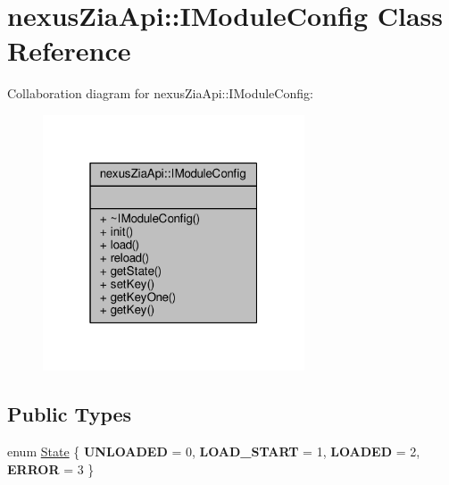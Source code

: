 \hypertarget{classnexusZiaApi_1_1IModuleConfig}{}\section{nexus\+Zia\+Api\+:\+:I\+Module\+Config Class Reference}
\label{classnexusZiaApi_1_1IModuleConfig}


Collaboration diagram for nexus\+Zia\+Api\+:\+:I\+Module\+Config\+:\nopagebreak
\begin{figure}[H]
\begin{center}
\leavevmode
\includegraphics[width=220pt]{classnexusZiaApi_1_1IModuleConfig__coll__graph}
\end{center}
\end{figure}
\subsection*{Public Types}
\begin{DoxyCompactItemize}
\item 
enum \hyperlink{classnexusZiaApi_1_1IModuleConfig_af31b1666dea53f8776c7399e6df9e865}{State} \{ {\bfseries U\+N\+L\+O\+A\+D\+ED} = 0, 
{\bfseries L\+O\+A\+D\+\_\+\+S\+T\+A\+RT} = 1, 
{\bfseries L\+O\+A\+D\+ED} = 2, 
{\bfseries E\+R\+R\+OR} = 3
 \}
\end{DoxyCompactItemize}
